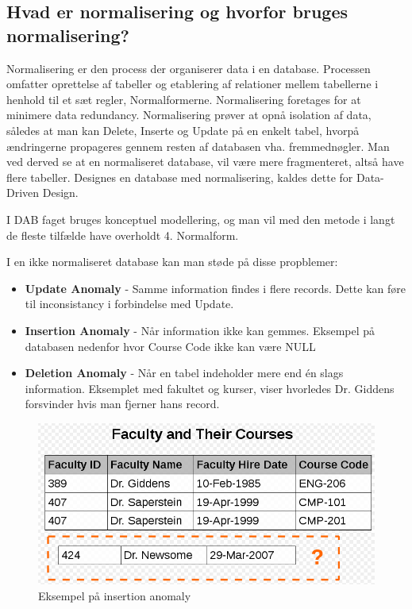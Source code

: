 \newpage

\subsection{Hvad er normalisering og hvorfor bruges normalisering?}\label{sec:normal}
Normalisering er den process der organiserer data i en database. Processen omfatter oprettelse af tabeller og etablering af relationer mellem tabellerne i henhold til et sæt regler, Normalformerne. Normalisering foretages for at minimere data redundancy. Normalisering prøver at opnå isolation af data, således at man kan Delete, Inserte og Update på en enkelt tabel, hvorpå ændringerne propageres gennem resten af databasen vha. fremmednøgler. Man ved derved se at en normaliseret database, vil være mere fragmenteret, altså have flere tabeller. Designes en database med normalisering, kaldes dette for Data-Driven Design.

I DAB faget bruges konceptuel modellering, og man vil med den metode i langt de fleste tilfælde have overholdt 4. Normalform.

I en ikke normaliseret database kan man støde på disse propblemer:

\begin{itemize}
	\item \textbf{Update Anomaly} - Samme information findes i flere records. Dette kan føre til inconsistancy i forbindelse med Update.
	\item \textbf{Insertion Anomaly} - Når information ikke kan gemmes. Eksempel på databasen nedenfor hvor Course Code ikke kan være NULL
	\item \textbf{Deletion Anomaly} - Når en tabel indeholder mere end én slags information. Eksemplet med fakultet og kurser, viser hvorledes Dr. Giddens forsvinder hvis man fjerner hans record.	
\end{itemize}

\begin{figure}[H]
	\centering
	\includegraphics[width=0.7\linewidth]{figs/spm5/insertionAnomaly.PNG}
	\caption{Eksempel på insertion anomaly}
	\label{fig:insertionAnomaly}
\end{figure}

